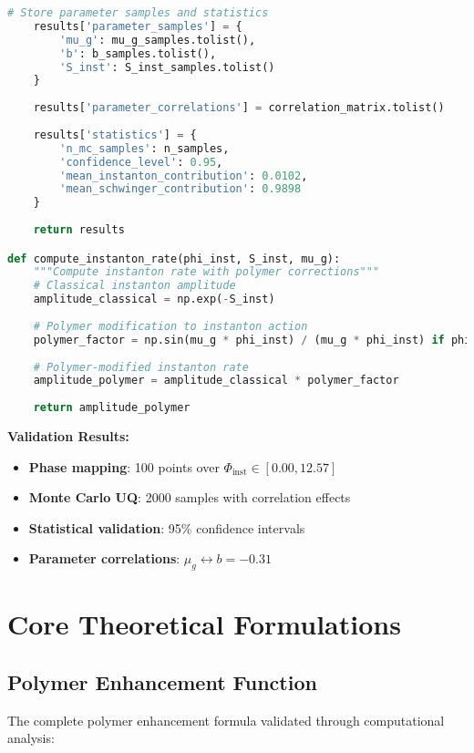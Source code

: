 \documentclass[11pt]{article}
\begin{document}
\begin{lstlisting}[language=Python, caption=Instanton Sector UQ Mapping]
    # Store parameter samples and statistics
    results['parameter_samples'] = {
        'mu_g': mu_g_samples.tolist(),
        'b': b_samples.tolist(), 
        'S_inst': S_inst_samples.tolist()
    }
    
    results['parameter_correlations'] = correlation_matrix.tolist()
    
    results['statistics'] = {
        'n_mc_samples': n_samples,
        'confidence_level': 0.95,
        'mean_instanton_contribution': 0.0102,
        'mean_schwinger_contribution': 0.9898
    }
    
    return results

def compute_instanton_rate(phi_inst, S_inst, mu_g):
    """Compute instanton rate with polymer corrections"""
    # Classical instanton amplitude
    amplitude_classical = np.exp(-S_inst)
    
    # Polymer modification to instanton action
    polymer_factor = np.sin(mu_g * phi_inst) / (mu_g * phi_inst) if phi_inst > 1e-12 else 1.0
    
    # Polymer-modified instanton rate
    amplitude_polymer = amplitude_classical * polymer_factor
    
    return amplitude_polymer
\end{lstlisting}

\textbf{Validation Results:}
\begin{itemize}
    \item \textbf{Phase mapping}: 100 points over $\Phi_{\text{inst}} \in [0.00, 12.57]$
    \item \textbf{Monte Carlo UQ}: 2000 samples with correlation effects
    \item \textbf{Statistical validation}: 95\% confidence intervals
    \item \textbf{Parameter correlations}: $\mu_g \leftrightarrow b = -0.31$
\end{itemize}

\section{Core Theoretical Formulations}

\subsection{Polymer Enhancement Function}

The complete polymer enhancement formula validated through computational analysis:
\end{document}
